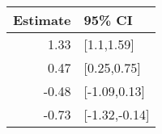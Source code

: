 \begin{tabular}{rl}
  \hline
Estimate & 95\% CI \\ 
  \hline
1.33 & [1.1,1.59] \\ 
  0.47 & [0.25,0.75] \\ 
  -0.48 & [-1.09,0.13] \\ 
  -0.73 & [-1.32,-0.14] \\ 
   \hline
\end{tabular}

